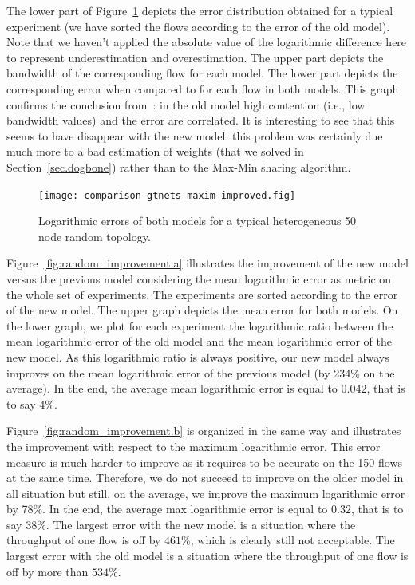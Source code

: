 \documentclass{sig-alternate}
\def\ie{i.e.,\xspace}
\begin{document}
The lower part of Figure~\ref{fig:random_error_1} depicts the error
distribution obtained for a typical experiment (we have sorted the
flows according to the error of the old \simgrid model). Note that we
haven't applied the absolute value of the logarithmic difference here
to represent underestimation and overestimation.  The upper part
depicts the bandwidth of the corresponding flow for each model. The
lower part depicts the corresponding error when compared to \gtnets 
for each flow in both models.  This
graph confirms the conclusion from~\cite{nstools07}: in the old
\simgrid model high contention (\ie low
bandwidth values) and the error are correlated. It is interesting to see that this
seems to have disappear with the new model: this problem was certainly
due much more to a bad estimation of weights (that we solved in
Section~\ref{sec.dogbone}) rather than to the Max-Min sharing algorithm.

\begin{figure}
  \centering
  \texttt{[image: comparison-gtnets-maxim-improved.fig]}
  \caption{Logarithmic errors of both models for a typical
    heterogeneous 50 node random topology.}
  \label{fig:random_error_1}
\end{figure}

Figure~\ref{fig:random_improvement.a} illustrates the improvement of
the new model versus the previous \simgrid model considering the
mean logarithmic error as metric on the whole set of experiments. The
experiments are sorted according to the error of the new model. The
upper graph depicts the mean error for both models. On the lower
graph, we plot for each experiment the logarithmic ratio between the
mean logarithmic error of the old \simgrid model and the mean
logarithmic error of the new model.  As this logarithmic ratio is
always positive, our new model always improves on the mean logarithmic
error of the previous model (by 234\% on the average). In the end, the
average mean logarithmic error is equal to $0.042$, that is to say
$4\%$.

Figure~\ref{fig:random_improvement.b} is organized in the same way and
illustrates the improvement with respect to the maximum logarithmic
error. This error measure is much harder to improve as it requires to
be accurate on the 150 flows at the same time. Therefore, we do not
succeed to improve on the older model in all situation but still, on
the average, we improve the maximum logarithmic error by 78\%.  In the
end, the average max logarithmic error is equal to $0.32$, that is
to say $38\%$. The largest error with the new model is a situation
where the throughput of one flow is off by $461\%$, which is clearly
still not acceptable. The largest error with the old model is a
situation where the throughput of one flow is off by more than
$534\%$.
\end{document}
